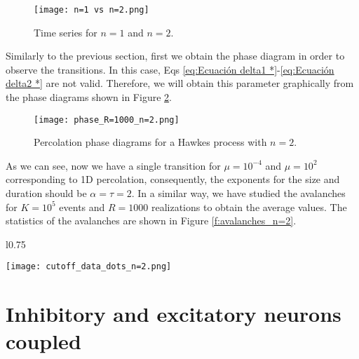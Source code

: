 \begin{figure}[H]
    \centering
    \texttt{[image: n=1 vs n=2.png]}
    \caption{Time series for $n=1$ and $n=2$.}
    \label{f:n=1 vs n=2}
\end{figure}

Similarly to the previous section, first we obtain the phase diagram in order to observe the transitions. In this case, Eqs \ref{eq:Ecuación delta1 *}-\ref{eq:Ecuación delta2 *} are not valid.
Therefore, we will obtain this parameter graphically from the phase diagrams shown in Figure \ref{f:phase_diagram_n=2}.
\begin{figure}[H]
    \centering
    \texttt{[image: phase\_R=1000\_n=2.png]}
    \caption{Percolation phase diagrams for a Hawkes process with $n=2$.}
    \label{f:phase_diagram_n=2}
\end{figure}

As we can see, now we have a single transition for $\mu=10^{-4}$ and $\mu=10^2$ corresponding to 1D percolation, consequently, the exponents for the size and duration 
should be $\alpha=\tau=2$. In a similar way, we have studied the avalanches for $K=10^5$ events and $R=1000$ realizations to obtain the average values. The statistics of the avalanches 
are shown in Figure \ref{f:avalanches_n=2}.


\begin{wrapfigure}{l}{0.75\textwidth}
    \begin{center}
      \texttt{[image: cutoff\_data\_dots\_n=2.png]}
    \end{center}
    \caption{Avalanche statistics for a self-exciting Hawkes process with $n=2$ for $K=10^5$ events averaged over $R=1000$ realizations.}
    \label{f:avalanches_n=2}
\end{wrapfigure}
\clearpage
\section{Inhibitory and excitatory neurons coupled}
